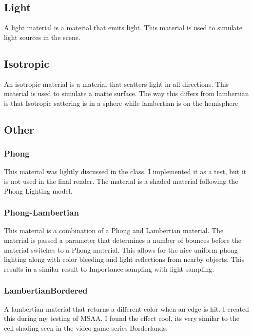\documentclass{article}
\begin{document}
    \subsection{Light}
    A light material is a material that emits light. This material is used to simulate light sources in the scene. \par



    \subsection{Isotropic}
    An isotropic material is a material that scatters light in all directions. This material is used to simulate a matte surface. The way this differs from lambertian is that Isotropic sattering is in a sphere while lambertian is on the hemisphere \par



    \subsection{Other}



        \subsubsection{Phong}
        This material was lightly discussed in the class. I implemented it as a test, but it is not used in the final render. The material is a shaded material following the Phong Lighting model. \par



        \subsubsection{Phong-Lambertian}
        This material is a combination of a Phong and Lambertian material. The material is passed a parameter that determines a number of bounces before the material switches to a Phong material. This allows for the nice uniform phong lighting along with color bleeding and light reflections from nearby objects. This results in a similar result to Importance sampling with light sampling.\par

        
        \subsubsection{LambertianBordered}
        A lambertian material that returns a different color when an edge is hit. I created this during my testing of MSAA. I found the effect cool, its very similar to the cell shading seen in the video-game series Borderlands.\par
\end{document}

